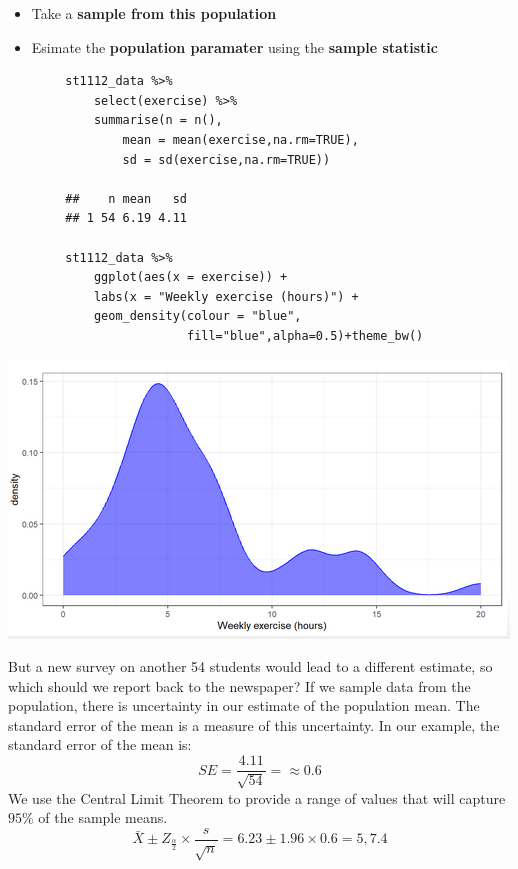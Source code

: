 \documentclass[a4paper, 10pt]{article}
\begin{document}
\begin{examplebox}
    \begin{itemize}
        \item Take a \textbf{sample from this population}
        \item Esimate the \textbf{population paramater} using the \textbf{sample statistic}
    \end{itemize}

    \begin{lstlisting}
        st1112_data %>% 
            select(exercise) %>% 
            summarise(n = n(),
                mean = mean(exercise,na.rm=TRUE),
                sd = sd(exercise,na.rm=TRUE))
        
        ##    n mean   sd
        ## 1 54 6.19 4.11

        st1112_data %>% 
            ggplot(aes(x = exercise)) + 
            labs(x = "Weekly exercise (hours)") +
            geom_density(colour = "blue", 
                         fill="blue",alpha=0.5)+theme_bw()
    \end{lstlisting}
    \begin{center}
        \includegraphics[scale=0.5]{images/exercise.png}
    \end{center}

    But a new survey on another 54 students would lead to a different estimate, so which should we report back to the newspaper?
    If we sample data from the population, there is uncertainty in our estimate of the population mean.
    The standard error of the mean is a measure of this uncertainty. In our example, the standard error of the mean is:
    $$SE = \frac{4.11}{\sqrt{54}} = \approx 0.6$$
    We use the Central Limit  Theorem to provide a range of values that will capture $95\%$ of the sample means.
    $$\bar{X} \pm Z_{\frac{\alpha}{2}} \times \frac{s}{\sqrt{n}} = 6.23 \pm 1.96 \times 0.6 = 5, 7.4$$
\end{examplebox}
\end{document}
